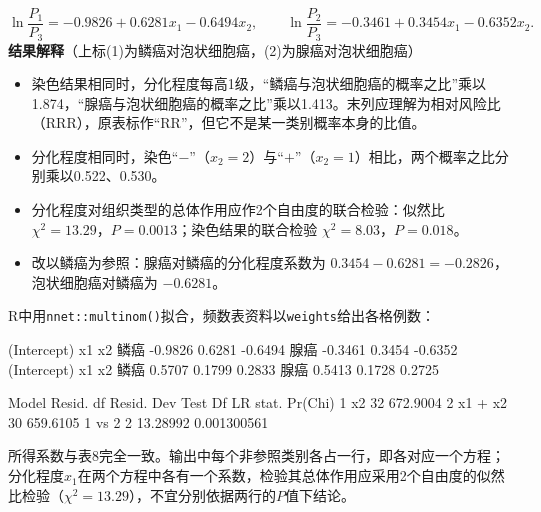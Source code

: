\[
\ln\frac{P_1}{P_3}=-0.9826+0.6281x_1-0.6494x_2,\qquad
\ln\frac{P_2}{P_3}=-0.3461+0.3454x_1-0.6352x_2.
\]
\textbf{结果解释}（上标(1)为鳞癌对泡状细胞癌，(2)为腺癌对泡状细胞癌）
\begin{itemize}
\item 染色结果相同时，分化程度每高1级，“鳞癌与泡状细胞癌的概率之比”乘以1.874，“腺癌与泡状细胞癌的概率之比”乘以1.413。末列应理解为相对风险比（RRR），原表标作“RR”，但它不是某一类别概率本身的比值。
\item 分化程度相同时，染色“$-$”（$x_2=2$）与“$+$”（$x_2=1$）相比，两个概率之比分别乘以0.522、0.530。
\item 分化程度对组织类型的总体作用应作2个自由度的联合检验：似然比 $\chi^2=13.29$，$P=0.0013$；染色结果的联合检验 $\chi^2=8.03$，$P=0.018$。
\item 改以鳞癌为参照：腺癌对鳞癌的分化程度系数为 $0.3454-0.6281=-0.2826$，泡状细胞癌对鳞癌为 $-0.6281$。
\end{itemize}
R中用\texttt{nnet::multinom()}拟合，频数表资料以\texttt{weights}给出各格例数：
\par\noindent
{}
\begin{routput}
     (Intercept)     x1      x2
鳞癌     -0.9826 0.6281 -0.6494
腺癌     -0.3461 0.3454 -0.6352
     (Intercept)     x1     x2
鳞癌      0.5707 0.1799 0.2833
腺癌      0.5413 0.1728 0.2725

    Model Resid. df Resid. Dev   Test    Df LR stat.     Pr(Chi)
1      x2        32   672.9004                                  
2 x1 + x2        30   659.6105 1 vs 2     2 13.28992 0.001300561
\end{routput}
所得系数与表8完全一致。输出中每个非参照类别各占一行，即各对应一个方程；分化程度$x_1$在两个方程中各有一个系数，检验其总体作用应采用2个自由度的似然比检验（$\chi^2=13.29$），不宜分别依据两行的$P$值下结论。
